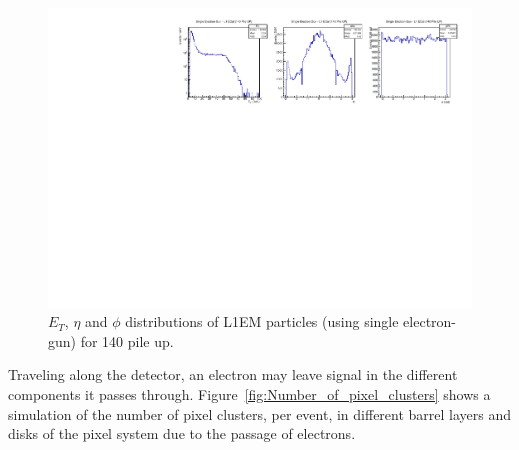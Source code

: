 \begin{figure}[!htb]
  \centering
  \includegraphics[scale=0.8]{../SimulationTools/L1EM_EtEtaPhi_140PileUP.pdf}
  \caption{$E_{T}$, $\eta$ and $\phi$ distributions of L1EM particles (using single electron-gun) for 140 pile up.}
  \label{fig:L1EM_EtEtaPhi_140PileUP}
\end{figure}

Traveling along the detector, an electron may leave signal in the different components it passes through.
Figure~\ref{fig:Number_of_pixel_clusters} shows a simulation of the number of pixel clusters, per event, in different
barrel layers and disks of the pixel system due to the passage of electrons.

